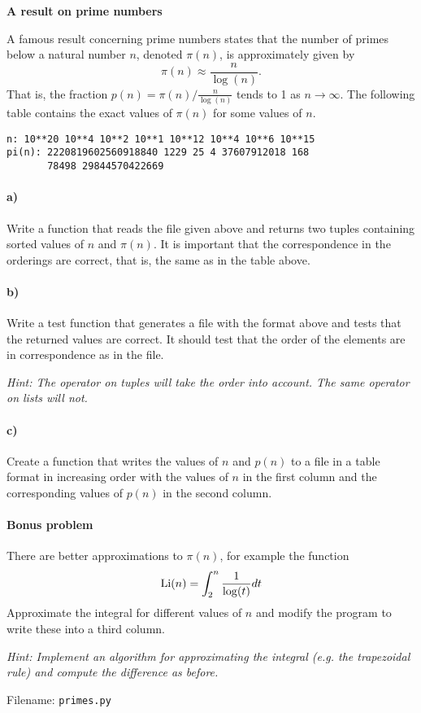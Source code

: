\begin{Problem}{\textbf{A result on prime numbers}} \label{prob46}

\noindent A famous result concerning prime numbers states that the number of primes below
a natural number $n$, denoted $\pi(n)$, is approximately given by
\begin{equation*}
    \pi(n)\approx \frac{n}{\log(n)}.
\end{equation*}
That is, the fraction $p(n)=\pi(n)/\frac{n}{\log(n)}$ tends to 1 as $n\to \infty$.
The following table contains the exact values of $\pi(n)$ for some values of $n$.
\begin{lstlisting}
n: 10**20 10**4 10**2 10**1 10**12 10**4 10**6 10**15
pi(n): 2220819602560918840 1229 25 4 37607912018 168 
       78498 29844570422669
\end{lstlisting}
\paragraph{a)}
Write a function that reads the file given above and returns two tuples containing
sorted values of $n$ and $\pi(n)$. It is important that the correspondence
in the orderings are correct, that is, the same as in the table above.
\paragraph{b)}
Write a test function that generates a file with the format above and tests that
the returned values are correct. It should test that the order of the elements
are in correspondence as in the file.

\emph{Hint: The \pythoninline{==} operator on tuples will take the order into account.
The same operator on lists will not.}
\paragraph{c)}
Create a function that writes the values of $n$ and $p(n)$ to a file in a table format in
increasing order with the values of $n$ in the first column and the corresponding
values of $p(n)$ in the second column.
\paragraph{Bonus problem}
There are better approximations to $\pi(n)$, for example the function
\begin{equation*}
    \operatorname{Li}(n)=\int_2^n \frac{1}{\log(t)} dt
\end{equation*}
Approximate the integral for different values of $n$ and modify the program to
write these into a third column. 

\emph{Hint: Implement an algorithm for approximating the integral (e.g. the trapezoidal
rule) and compute the difference as before.}

Filename: \texttt{primes.py}
\end{Problem}

